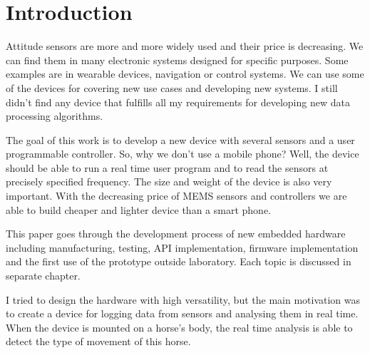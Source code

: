 \chapter{Introduction}
Attitude sensors are more and more widely used and their price is decreasing. We can find them in many electronic systems designed for specific purposes. Some examples are in wearable devices, navigation or control systems. We can use some of the devices for covering new use cases and developing new systems. I still didn't find any device that fulfills all my requirements for developing new data processing algorithms.

The goal of this work is to develop a new device with several sensors and a user programmable controller. So, why we don't use a mobile phone? Well, the device should be able to run a real time user program and to read the sensors at precisely specified frequency. The size and weight of the device is also very important. With the decreasing price of MEMS sensors and controllers we are able to build cheaper and lighter device than a smart phone.

This paper goes through the development process of new embedded hardware including manufacturing, testing, API implementation, firmware implementation and the first use of the prototype outside laboratory. Each topic is discussed in separate chapter.

I tried to design the hardware with high versatility, but the main motivation was to create a device for logging data from sensors and analysing them in real time. When the device is mounted on a horse's body, the real time analysis is able to detect the type of movement of this horse.
